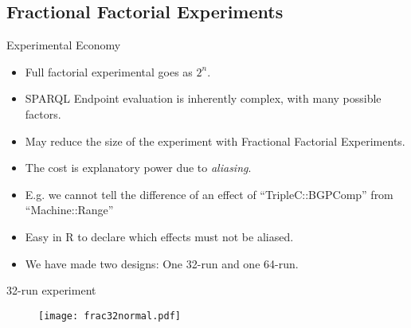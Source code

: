 \documentclass[english,usenames,dvipsnames,aspectratio=169]{beamer}
\begin{document}
\subsection{Fractional Factorial Experiments}

\begin{frame}{Experimental Economy}

  \begin{itemize}
  \item Full factorial experimental goes as $2^n$.
  \item SPARQL Endpoint evaluation is inherently complex, with many
    possible factors.
  \item May reduce the size of the experiment with Fractional
    Factorial Experiments.
  \item The cost is explanatory power due to \emph{aliasing}.
  \item E.g. we cannot tell the difference of an effect of
    ``TripleC::BGPComp'' from ``Machine::Range''
  \item Easy in R to declare which effects must not be aliased.
  \item We have made two designs: One 32-run and one 64-run.
  \end{itemize}
  
\end{frame}

\begin{frame}{32-run experiment}
\begin{figure}[ht!]
  \centerline{%
    \texttt{[image: frac32normal.pdf]}}
  \label{fig:frac32normal}
\end{figure}
 
\end{frame}
\end{document}
